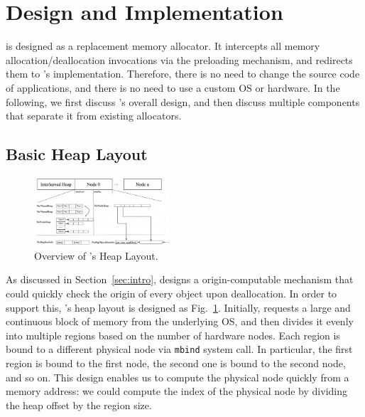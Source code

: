 \section{Design and Implementation}
\label{sec:implement}

\NM{} is designed as a replacement memory allocator. It intercepts all memory allocation/deallocation invocations via the preloading mechanism, and redirects them to \NM{}'s implementation. Therefore, there is no need to change the source code of applications, and there is no need to use a custom OS or hardware. In the following, we first discuss \NM{}'s overall design, and then discuss multiple components that separate it from existing allocators.

\subsection{Basic Heap Layout}
\label{sec:overview}

\begin{figure}[!ht]
\begin{center}
\includegraphics[width=0.45\textwidth]{SC2022/figure/numalloc-overview.png}
\end{center}
\caption{Overview of \NA{}'s Heap Layout.
\label{fig:overview}}
\end{figure}


As discussed in Section~\ref{sec:intro}, \NM{} designs a origin-computable mechanism that could quickly check the origin of every object upon deallocation. In order to support this, \NM{}'s heap layout is designed as  Fig.~\ref{fig:overview}. Initially, \NM{} requests a large and continuous block of memory from the underlying OS, and then divides it evenly into multiple regions based on the number of hardware nodes. Each region is bound to a different physical node via \texttt{mbind} system call. In particular, the first region is bound to the first node, the second one is bound to the second node, and so on. This design enables us to compute the physical node quickly from a memory address: we could compute the index of the physical node by dividing the heap offset by the region size. 

